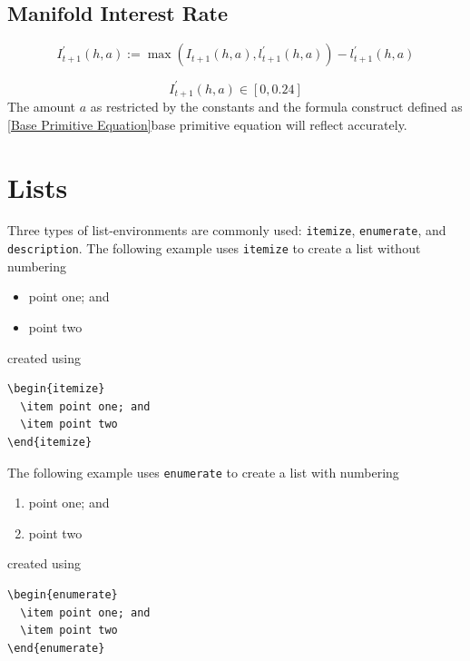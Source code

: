 {{{

\subsection{Manifold Interest Rate}
\begin{equation}
I_{t+1}^{\prime}(h, a):=\max \left(I_{t+1}(h, a), l_{t+1}^{\prime}(h, a)\right)-l_{t+1}^{\prime}(h, a)
\end{equation}

\begin{equation}
    I_{t+1}^{\prime}(h, a) \in[0,0.24]
\end{equation}
The amount $a$ as restricted by the constants and the formula construct defined as \ref{Base Primitive Equation}base primitive equation will reflect accurately.

\section{Lists}\label{sec:lists}
Three types of list-environments are commonly used: \texttt{itemize}, \texttt{enumerate}, and \texttt{description}. The following example uses \texttt{itemize} to create a list without numbering
\begin{itemize}
  \item point one; and
  \item point two
\end{itemize}
created using
\begin{verbatim}
\begin{itemize}
  \item point one; and
  \item point two
\end{itemize}
\end{verbatim}

The following example uses \texttt{enumerate} to create a list with numbering
\begin{enumerate}
  \item point one; and
  \item point two
\end{enumerate}
created using
\begin{verbatim}
\begin{enumerate}
  \item point one; and
  \item point two
\end{enumerate}
\end{verbatim}

}}}

